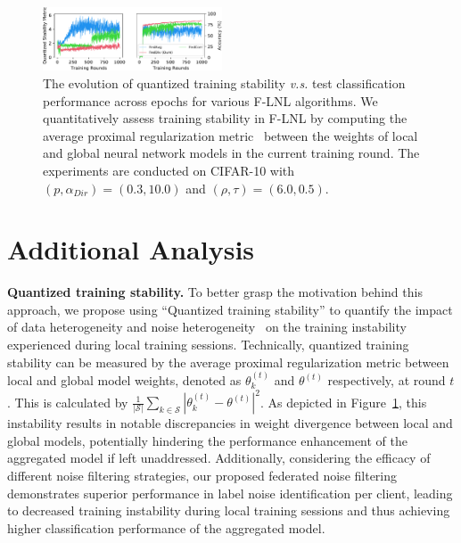 \documentclass[letterpaper]{article} %
\begin{document}
\begin{figure}[t]
    \centering

    \includegraphics[width=0.475\textwidth]{figures/stabiltiy_visualization.pdf}

    \caption{The evolution of quantized training stability \textit{v.s.} test classification performance across epochs for various F-LNL algorithms. We quantitatively assess training stability in F-LNL by computing the average proximal regularization metric~\cite{FedProx, xu2022fedcorr} between the weights of local and global neural network models in the current training round. The experiments are conducted on CIFAR-10 with $(p, \alpha_{Dir})=(0.3, 10.0)$ and $(\rho, \tau)=(6.0, 0.5)$.
    } 
    \label{Figure:Instability}
\end{figure}

\section{Additional Analysis}

\noindent
\textbf{Quantized training stability.}
To better grasp the motivation behind this approach, we propose using ``Quantized training stability'' to quantify the impact of data heterogeneity and noise heterogeneity~\cite{kim2022fedrn,RoFL} on the training instability experienced during local training sessions. Technically, quantized training stability can be measured by the average proximal regularization metric between local and global model weights, denoted as $\theta_{k}^{(t)}$ and $\theta^{(t)}$ respectively, at round $t$. This is calculated by $\frac{1}{|\mathcal{S}|}\sum_{k\in\mathcal{S}} |\theta_{k}^{(t)}- \theta^{(t)}|^{2}$. As depicted in Figure~\textcolor{red}{\ref{Figure:Instability}}, this instability results in notable discrepancies in weight divergence between local and global models, potentially hindering the performance enhancement of the aggregated model if left unaddressed. Additionally, considering the efficacy of different noise filtering strategies, our proposed federated noise filtering demonstrates superior performance in label noise identification per client, leading to decreased training instability during local training sessions and thus achieving higher classification performance of the aggregated model.
\end{document}
